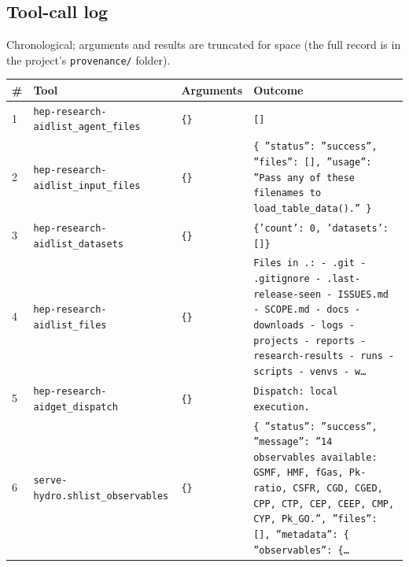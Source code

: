 \documentclass[11pt,a4paper]{article}
\begin{document}
\subsection{Tool-call log}
Chronological; arguments and results are truncated for space (the full record is in the project's \texttt{provenance/} folder).
\begin{longtable}{@{}p{}p{}p{}p{}@{}}
\toprule \# & Tool & Arguments & Outcome \\ \midrule \endhead
1 & \texttt{hep-research-aid}\newline\texttt{list\_\allowbreak{}agent\_\allowbreak{}files} & \texttt{\{\}\allowbreak{}} & \texttt{[]\allowbreak{}} \\
2 & \texttt{hep-research-aid}\newline\texttt{list\_\allowbreak{}input\_\allowbreak{}files} & \texttt{\{\}\allowbreak{}} & \texttt{\{   ''status'':\allowbreak{} ''success'',\allowbreak{}   ''files'':\allowbreak{} []\allowbreak{},\allowbreak{}   ''usage'':\allowbreak{} ''Pass any of these filenames to load\_\allowbreak{}table\_\allowbreak{}data()\allowbreak{}.'' \}\allowbreak{}} \\
3 & \texttt{hep-research-aid}\newline\texttt{list\_\allowbreak{}datasets} & \texttt{\{\}\allowbreak{}} & \texttt{\{'count':\allowbreak{} 0,\allowbreak{} 'datasets':\allowbreak{} []\allowbreak{}\}\allowbreak{}} \\
4 & \texttt{hep-research-aid}\newline\texttt{list\_\allowbreak{}files} & \texttt{\{\}\allowbreak{}} & \texttt{Files in .:\allowbreak{}   - .git   - .gitignore   - .last-release-seen   - ISSUES.md   - SCOPE.md   - docs   - downloads   - logs   - projects   - reports   - research-results   - runs   - scripts   - venvs   - w\ldots{}\allowbreak{}} \\
5 & \texttt{hep-research-aid}\newline\texttt{get\_\allowbreak{}dispatch} & \texttt{\{\}\allowbreak{}} & \texttt{Dispatch:\allowbreak{} local execution.} \\
6 & \texttt{serve-hydro.sh}\newline\texttt{list\_\allowbreak{}observables} & \texttt{\{\}\allowbreak{}} & \texttt{\{   ''status'':\allowbreak{} ''success'',\allowbreak{}   ''message'':\allowbreak{} ''14 observables available:\allowbreak{} GSMF,\allowbreak{} HMF,\allowbreak{} fGas,\allowbreak{} Pk-ratio,\allowbreak{} CSFR,\allowbreak{} CGD,\allowbreak{} CGED,\allowbreak{} CPP,\allowbreak{} CTP,\allowbreak{} CEP,\allowbreak{} CEEP,\allowbreak{} CMP,\allowbreak{} CYP,\allowbreak{} Pk\_\allowbreak{}GO.'',\allowbreak{}   ''files'':\allowbreak{} []\allowbreak{},\allowbreak{}   ''metadata'':\allowbreak{} \{     ''observables'':\allowbreak{} \{\ldots{}\allowbreak{}} \\

\end{longtable}
\end{document}
